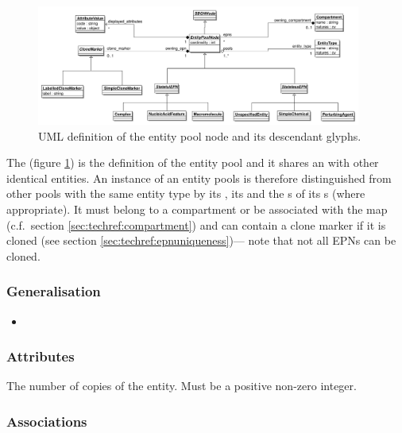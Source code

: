 \begin{figure}[htb]
  \centering
  \includegraphics[width=0.95\textwidth]{images/epnuml}
\caption{UML definition of the entity pool node and its descendant glyphs.}
  \label{fig:techref:epnuml}
\end{figure}

The  (figure \ref{fig:techref:epnuml}) is the
definition of the entity pool and it shares an 
with other identical entities. An instance of an entity pools is
therefore distinguished from other pools with the same entity type by
its , its  and the
s of its s (where
appropriate). It must belong to a compartment or be associated with
the map (c.f.\, section \ref{sec:techref:compartment}) and can contain a clone
marker if it is cloned (see section \ref{sec:techref:epnuniqueness})--- note
that not all EPNs can be cloned.

\subsubsection{Generalisation}

\begin{itemize}
\item {}
\end{itemize}

\subsubsection{Attributes}

\begin{attributes}
   The number of copies of the entity. Must
  be a positive non-zero integer.
\end{attributes}

\subsubsection{Associations}

